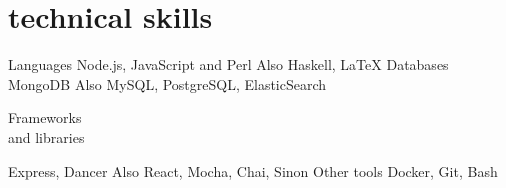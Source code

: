 \documentclass[a4paper]{friggeri-cv}
\begin{document}
\section{technical skills}

\begin{entrylist}
    \entry
        {Languages}
        {Node.js, JavaScript and Perl}
        {}
        {\small Also Haskell, \LaTeX}
        {\vspace{-0.5cm}}
    \entry
        {Databases}
        {MongoDB}
        {}
        {\small Also MySQL, PostgreSQL, ElasticSearch}
        {\vspace{-0.5cm}}
    \entry
    {\parbox[t][][t]{2.3cm}{Frameworks\\{\small and libraries}}}
        {Express, Dancer}
        {}
        {\small Also React, Mocha, Chai, Sinon}
        {\vspace{-0.4cm}}
    \entry
        {Other tools}
        {Docker, Git, Bash}
        {}
        {}
        {\vspace{-3.8cm}}
\end{entrylist}
\end{document}

